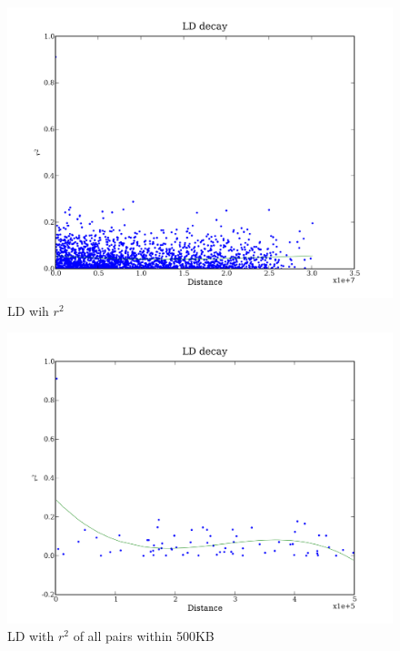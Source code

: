 \documentclass[a4paper,10pt]{article}
\begin{document}
\begin{figure}
\includegraphics[width=1\textwidth]{figures/data_d110_c0_5_LD_r2_0.png}
\caption{LD wih $r^2$}\label{fld_1}
\end{figure}

\begin{figure}
\includegraphics[width=1\textwidth]{figures/data_d110_c0_5_LD_r2_500000.png}
\caption{LD with $r^2$ of all pairs within 500KB}\label{fld_2}
\end{figure}
\end{document}

